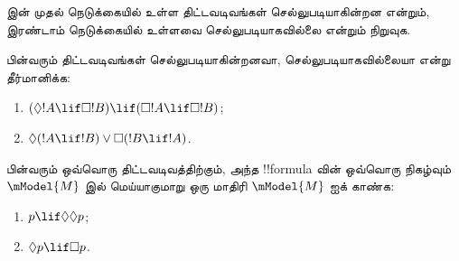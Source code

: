 \documentclass[../../../include/open-logic-section]{subfiles}
\begin{document}
\begin{prob}%
   இன் முதல் நெடுக்கையில்
  உள்ள திட்டவடிவங்கள் செல்லுபடியாகின்றன என்றும், இரண்டாம் நெடுக்கையில்
  உள்ளவை செல்லுபடியாகவில்லை என்றும் நிறுவுக.
\end{prob}

\begin{prob}
  பின்வரும் திட்டவடிவங்கள் செல்லுபடியாகின்றனவா, செல்லுபடியாகவில்லையா என்று
  தீர்மானிக்க:
  \begin{enumerate}
  \item $(\Diamond !A \lif \Box !B) \lif (\Box !A \lif \Box
    !B)$;
  \item $\Diamond(!A \lif !B) \lor \Box(!B \lif !A)$.
  \end{enumerate}
\end{prob}

\begin{prob}
  பின்வரும் ஒவ்வொரு திட்டவடிவத்திற்கும், அந்த !!{formula} வின் ஒவ்வொரு
  நிகழ்வும் $\mModel{M}$ இல் மெய்யாகுமாறு ஒரு மாதிரி $\mModel{M}$ ஐக்
  காண்க:
  \begin{enumerate}
  \item $p \lif \Diamond\Diamond p$;
  \item $\Diamond p \lif \Box p$.
  \end{enumerate}
\end{prob}
\end{document}
